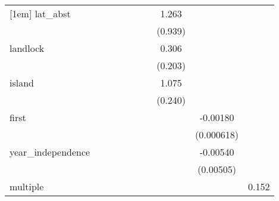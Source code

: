 {\begin{tabular}{l*{9}{c}}
[1em]
lat\_abst    &                     &                     &                     &                     &                     &                     &       1.263         &                     &                     \\
            &                     &                     &                     &                     &                     &                     &     (0.939)         &                     &                     \\
[1em]
landlock    &                     &                     &                     &                     &                     &                     &       0.306         &                     &                     \\
            &                     &                     &                     &                     &                     &                     &     (0.203)         &                     &                     \\
[1em]
island      &                     &                     &                     &                     &                     &                     &       1.075\sym{***}&                     &                     \\
            &                     &                     &                     &                     &                     &                     &     (0.240)         &                     &                     \\
[1em]
first       &                     &                     &                     &                     &                     &                     &                     &    -0.00180\sym{***}&                     \\
            &                     &                     &                     &                     &                     &                     &                     &  (0.000618)         &                     \\
[1em]
year\_independence&                     &                     &                     &                     &                     &                     &                     &    -0.00540         &                     \\
            &                     &                     &                     &                     &                     &                     &                     &   (0.00505)         &                     \\
[1em]
multiple    &                     &                     &                     &                     &                     &                     &                     &                     &       0.152         \\

\end{tabular}}
